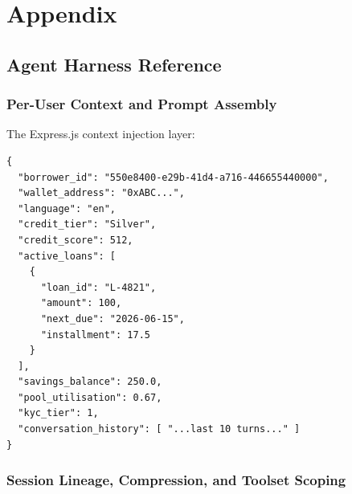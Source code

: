 \documentclass[12pt,a4paper]{report}
\begin{document}
%
%
\chapter{Appendix}
\label{app:combined}

\section{Agent Harness Reference}
\label{app:agent-harness}

\subsection{Per-User Context and Prompt Assembly}

The Express.js context injection layer:

\begin{verbatim}
{
  "borrower_id": "550e8400-e29b-41d4-a716-446655440000",
  "wallet_address": "0xABC...",
  "language": "en",
  "credit_tier": "Silver",
  "credit_score": 512,
  "active_loans": [
    {
      "loan_id": "L-4821",
      "amount": 100,
      "next_due": "2026-06-15",
      "installment": 17.5
    }
  ],
  "savings_balance": 250.0,
  "pool_utilisation": 0.67,
  "kyc_tier": 1,
  "conversation_history": [ "...last 10 turns..." ]
}
\end{verbatim}

\subsection{Session Lineage, Compression, and Toolset Scoping}
\end{document}
